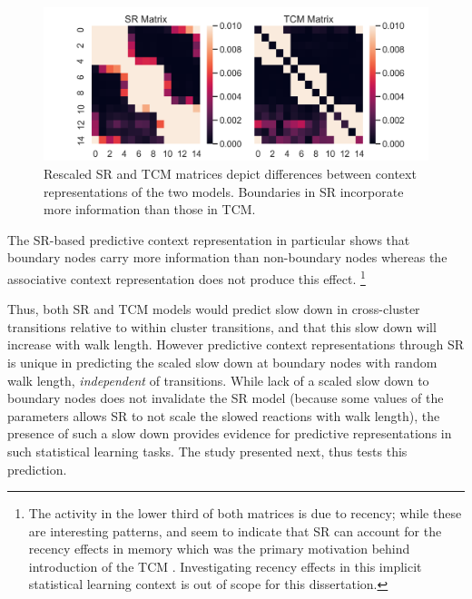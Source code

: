 \begin{figure}[ht]
	\centering
	\label{fig:zoomed-in-SRTCM-boundary-entropy}
	\includegraphics[width = \textwidth]{chapter_notebooks/chapter_2/figures/SR_vs_TCM_Matrices_zoomed.png}
	\caption{Rescaled SR and TCM matrices depict differences between context representations of the two models. Boundaries in SR incorporate more information than those in TCM.}
\end{figure}

The SR-based predictive context representation in particular shows that boundary nodes carry more information than non-boundary nodes whereas the associative context representation does not produce this effect. \footnote{The activity in the lower third of both matrices is due to recency; while these are interesting patterns, and seem to indicate that SR can account for the recency effects in memory which was the primary motivation behind introduction of the TCM \cite{gershman2012successor,howard2005temporal}. Investigating recency effects in this implicit statistical learning context is out of scope for this dissertation.}

Thus, both SR and TCM models would predict slow down in cross-cluster transitions relative to within cluster transitions, and that this slow down will increase with walk length. However predictive context representations through SR is unique in predicting the scaled slow down at boundary nodes with random walk length, \textit{independent} of transitions. While lack of a scaled slow down to boundary nodes does not invalidate the SR model (because some values of the parameters allows SR to not scale the slowed reactions with walk length), the presence of such a slow down provides evidence for predictive representations in such statistical learning tasks. The study presented next, thus tests this prediction. 




